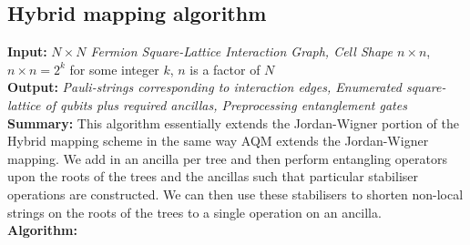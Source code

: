 \subsection{Hybrid\+ mapping algorithm}
\label{section:auxHybridmapping}
\noindent
\textbf{Input:} \textit{$N\times N$ Fermion Square-Lattice Interaction Graph, Cell Shape $n \times n$}, $n \times n = 2^k$ for some integer $k$, $n$ is a factor of $N$\\
\textbf{Output:} \textit{Pauli-strings corresponding to interaction edges, Enumerated square-lattice of qubits plus required ancillas, Preprocessing entanglement gates}\\
\textbf{Summary:} This algorithm essentially extends the Jordan-Wigner portion of the Hybrid mapping scheme in the same way AQM extends the Jordan-Wigner mapping. We add in an ancilla per tree and then perform entangling operators upon the roots of the trees and the ancillas such that particular stabiliser operations are constructed. We can then use these stabilisers to shorten non-local strings on the roots of the trees to a single operation on an ancilla.\\
\textbf{Algorithm:}
